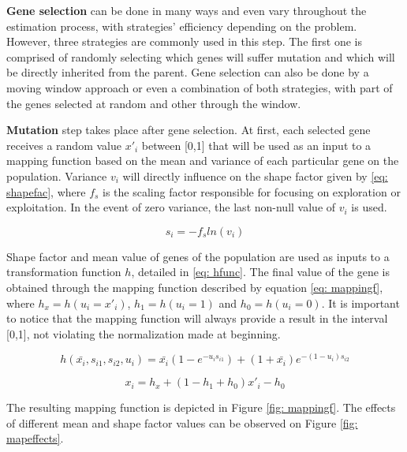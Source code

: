 \textbf{Gene selection} can be done in many ways and even vary throughout the estimation process, with strategies' efficiency depending on the problem. However, three strategies are commonly used in this step. The first one is comprised of randomly selecting which genes will suffer mutation and which will be directly inherited from the parent. Gene selection can also be done by a moving window approach or even a combination of both strategies, with part of the genes selected at random and other through the window.

\textbf{Mutation} step takes place after gene selection. At first, each selected gene receives a random value $x'_{i}$ between [0,1] that will be used as an input to a mapping function based on the mean and variance of each particular gene on the population. Variance $v_{i}$ will directly influence on the shape factor given by \eqref{eq: shapefac}, where $f_{s}$ is the scaling factor responsible for focusing on exploration or exploitation. In the event of zero variance, the last non-null value of $v_{i}$ is used.

\begin{equation}
	s_{i} = -f_{s}ln(v_{i})
	\label{eq: shapefac}
\end{equation}

Shape factor and mean value of genes of the population are used as inputs to a transformation function $h$, detailed in \eqref{eq: hfunc}. The final value of the gene is obtained through the mapping function described by equation \eqref{eq: mappingf}, where $h_{x} = h(u_{i} = x'_{i})$, $h_{1} = h(u_{i} = 1)$ and $h_{0} = h(u_{i} = 0)$. It is important to notice that the mapping function will always provide a result in the interval [0,1], not violating the normalization made at beginning.

\begin{equation}
	h(\bar{x_{i}}, s_{i1}, s_{i2}, u_{i}) = \bar{x_{i}}(1 - e^{-u_{i}s_{i1}}) + (1 + \bar{x_{i}})e^{-(1 - u_{i})s_{i2}}
	\label{eq: hfunc}
\end{equation}

\begin{equation}
	x_{i} = h_{x} + (1 - h_{1} + h_{0})x'_{i} - h_{0}
	\label{eq: mappingf}
\end{equation}

The resulting mapping function is depicted in Figure \ref{fig: mappingf}. The effects of different mean and shape factor values can be observed on Figure \ref{fig: mapeffects}.

